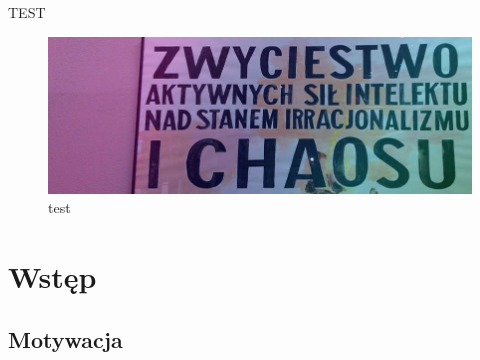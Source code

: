 
{\Large TEST} \\
\begin{figure}[h!]
\centering
\includegraphics[width=\textwidth]{chaos}
\caption{test}
\label{fig:test1}
\end{figure}



\newpage

\section{Wstęp}

\subsection{Motywacja}
